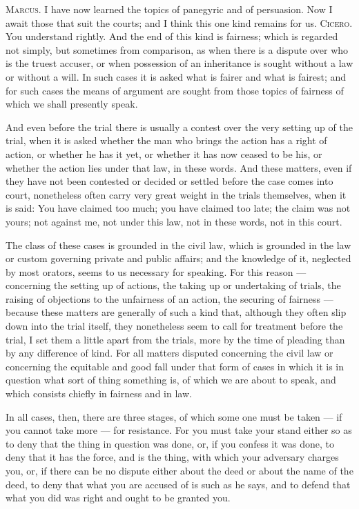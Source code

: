  \textsc{Marcus.} I have now learned the topics of panegyric and of persuasion. Now I await those that suit the courts; and I think this one kind remains for us. \textsc{Cicero.} You understand rightly. And the end of this kind is fairness; which is regarded not simply, but sometimes from comparison, as when there is a dispute over who is the truest accuser, or when possession of an inheritance is sought without a law or without a will. In such cases it is asked what is fairer and what is fairest; and for such cases the means of argument are sought from those topics of fairness of which we shall presently speak.

 And even before the trial there is usually a contest over the very setting up of the trial, when it is asked whether the man who brings the action has a right of action, or whether he has it yet, or whether it has now ceased to be his, or whether the action lies under that law, in these words. And these matters, even if they have not been contested or decided or settled before the case comes into court, nonetheless often carry very great weight in the trials themselves, when it is said: You have claimed too much; you have claimed too late; the claim was not yours; not against me, not under this law, not in these words, not in this court.

 The class of these cases is grounded in the civil law, which is grounded in the law or custom governing private and public affairs; and the knowledge of it, neglected by most orators, seems to us necessary for speaking. For this reason — concerning the setting up of actions, the taking up or undertaking of trials, the raising of objections to the unfairness of an action, the securing of fairness — because these matters are generally of such a kind that, although they often slip down into the trial itself, they nonetheless seem to call for treatment before the trial, I set them a little apart from the trials, more by the time of pleading than by any difference of kind. For all matters disputed concerning the civil law or concerning the equitable and good fall under that form of cases in which it is in question what sort of thing something is, of which we are about to speak, and which consists chiefly in fairness and in law.

 In all cases, then, there are three stages, of which some one must be taken — if you cannot take more — for resistance. For you must take your stand either so as to deny that the thing in question was done, or, if you confess it was done, to deny that it has the force, and is the thing, with which your adversary charges you, or, if there can be no dispute either about the deed or about the name of the deed, to deny that what you are accused of is such as he says, and to defend that what you did was right and ought to be granted you.

